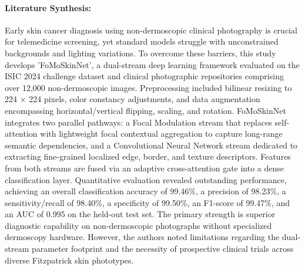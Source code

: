 \paragraph{Literature Synthesis:} Early skin cancer diagnosis using non-dermoscopic clinical photography is crucial for telemedicine screening, yet standard models struggle with unconstrained backgrounds and lighting variations. To overcome these barriers, this study develops 'FoMoSkinNet', a dual-stream deep learning framework evaluated on the ISIC 2024 challenge dataset and clinical photographic repositories comprising over 12,000 non-dermoscopic images. Preprocessing included bilinear resizing to 224 $\times$ 224 pixels, color constancy adjustments, and data augmentation encompassing horizontal/vertical flipping, scaling, and rotation. FoMoSkinNet integrates two parallel pathways: a Focal Modulation stream that replaces self-attention with lightweight focal contextual aggregation to capture long-range semantic dependencies, and a Convolutional Neural Network stream dedicated to extracting fine-grained localized edge, border, and texture descriptors. Features from both streams are fused via an adaptive cross-attention gate into a dense classification layer. Quantitative evaluation revealed outstanding performance, achieving an overall classification accuracy of 99.46\%, a precision of 98.23\%, a sensitivity/recall of 98.40\%, a specificity of 99.50\%, an F1-score of 99.47\%, and an AUC of 0.995 on the held-out test set. The primary strength is superior diagnostic capability on non-dermoscopic photographs without specialized dermoscopy hardware. However, the authors noted limitations regarding the dual-stream parameter footprint and the necessity of prospective clinical trials across diverse Fitzpatrick skin phototypes.

